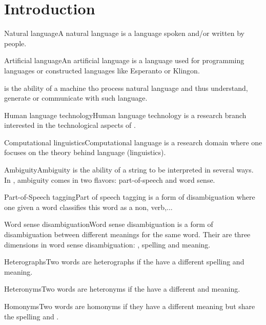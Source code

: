 \section{Introduction}
\begin{df}{Natural language}A natural language is a language spoken and/or written by people.
\end{df}
\begin{df}{Artificial language}An artificial language is a language used for programming languages or constructed languages like Esperanto or Klingon.
\end{df}
\begin{df}{\nlp{}}\nlp{} is the ability of a machine tho process natural language and thus understand, generate or communicate with such language.
\end{df}
\begin{df}{Human language technology}Human language technology is a research branch interested in the technological aspects of \nlp{}.
\end{df}
\begin{df}{Computational linguistics}Computational language is a research domain where one focuses on the theory behind language (linguistics).
\end{df}
\begin{df}{Ambiguity}Ambiguity is the ability of a string to be interpreted in several ways. In \nlp{}, ambiguity comes in two flavors: part-of-speech and word sense.
\end{df}
\begin{df}{Part-of-Speech tagging}Part of speech tagging is a form of disambiguation where one given a word classifies this word as a non, verb,...
\end{df}
\begin{df}{Word sense disambiguation}Word sense disambiguation is a form of disambiguation between different meanings for the same word. Their are three dimensions in word sense disambiguation: \pnc{}, spelling and meaning.
\end{df}
\begin{df}{Heterographs}Two words are heterographs if the have a different spelling and meaning.
\end{df}
\begin{df}{Heteronyms}Two words are heteronyms if the have a different \pnc{} and meaning.
\end{df}
\begin{df}{Homonyms}Two words are homonyms if they have a different meaning but share the spelling and \pnc{}.
\end{df}
